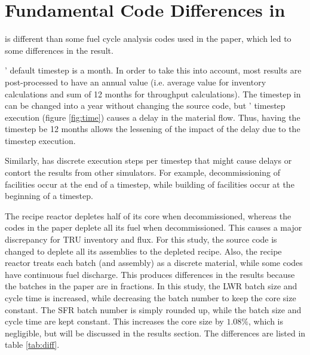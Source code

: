 
\section{Fundamental Code Differences in \Cyclus}

\Cyclus is different than some fuel cycle analysis codes
used in the paper, which led to some differences in the result.

\Cyclus' default timestep is a month. In order to take
this into account, most results are post-processed
to have an annual value (i.e. average value for
inventory calculations and sum of 12 months for
throughput calculations). The timestep in \Cyclus
can be changed into a year without changing the source
code, but \Cyclus' timestep execution (figure \ref{fig:time}) causes a delay
in the material flow. Thus, having the timestep be 12 months
allows the lessening of the impact of the delay due to the
\Cyclus timestep execution.

Similarly, \Cyclus has discrete
execution steps per timestep that might cause delays or contort
the results from other simulators. For example, decommissioning of
facilities occur at the end of a timestep, while building of facilities
occur at the beginning of a timestep.

The \Cycamore recipe reactor depletes half of its core when decommissioned,
whereas the codes in the paper deplete all its fuel when decommissioned. This causes a major
discrepancy for \gls{TRU} inventory and flux. For this study, the \Cycamore
source code is changed to deplete all its assemblies to the depleted recipe.
Also, the \Cycamore recipe reactor treats each batch (and assembly) as a discrete
material, while some codes have continuous fuel discharge. This produces
differences in the results because the batches in the paper are in fractions.
In this study, the \gls{LWR} batch size and cycle time is increased, while
decreasing the batch number to keep the core size constant. The \gls{SFR} batch
number is simply rounded up, while the batch size and cycle time are kept constant.
This increases the core size by $1.08 \%$, which is negligible, but will be
discussed in the results section.
The differences are listed in table \ref{tab:diff}.


